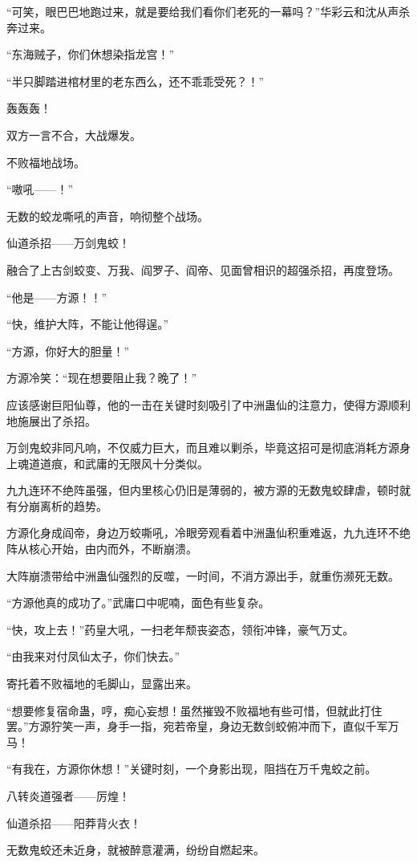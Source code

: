 \begin{this_body}
“可笑，眼巴巴地跑过来，就是要给我们看你们老死的一幕吗？”华彩云和沈从声杀奔过来。

“东海贼子，你们休想染指龙宫！”

“半只脚踏进棺材里的老东西么，还不乖乖受死？！”

轰轰轰！

双方一言不合，大战爆发。

不败福地战场。

“嗷吼——！”

无数的蛟龙嘶吼的声音，响彻整个战场。

仙道杀招——万剑鬼蛟！

融合了上古剑蛟变、万我、阎罗子、阎帝、见面曾相识的超强杀招，再度登场。

“他是——方源！！”

“快，维护大阵，不能让他得逞。”

“方源，你好大的胆量！”

方源冷笑：“现在想要阻止我？晚了！”

应该感谢巨阳仙尊，他的一击在关键时刻吸引了中洲蛊仙的注意力，使得方源顺利地施展出了杀招。

万剑鬼蛟非同凡响，不仅威力巨大，而且难以剿杀，毕竟这招可是彻底消耗方源身上魂道道痕，和武庸的无限风十分类似。

九九连环不绝阵虽强，但内里核心仍旧是薄弱的，被方源的无数鬼蛟肆虐，顿时就有分崩离析的趋势。

方源化身成阎帝，身边万蛟嘶吼，冷眼旁观看着中洲蛊仙积重难返，九九连环不绝阵从核心开始，由内而外，不断崩溃。

大阵崩溃带给中洲蛊仙强烈的反噬，一时间，不消方源出手，就重伤濒死无数。

“方源他真的成功了。”武庸口中呢喃，面色有些复杂。

“快，攻上去！”药皇大吼，一扫老年颓丧姿态，领衔冲锋，豪气万丈。

“由我来对付凤仙太子，你们快去。”

寄托着不败福地的毛脚山，显露出来。

“想要修复宿命蛊，哼，痴心妄想！虽然摧毁不败福地有些可惜，但就此打住罢。”方源狞笑一声，身手一指，宛若帝皇，身边无数剑蛟俯冲而下，直似千军万马！

“有我在，方源你休想！”关键时刻，一个身影出现，阻挡在万千鬼蛟之前。

八转炎道强者——厉煌！

仙道杀招——阳莽背火衣！

无数鬼蛟还未近身，就被醉意灌满，纷纷自燃起来。


\end{this_body}
